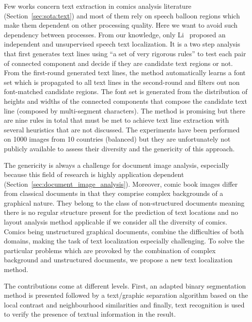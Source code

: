 Few works concern text extraction in comics analysis literature (Section~\ref{sec:sota:text}) and most of them rely on speech balloon regions which make them dependent on other processing quality.
Here we want to avoid such dependency between processes.
From our knowledge, only Li~\cite{Li2013Unsupervised} proposed an independent and unsupervised speech text localization.
It is a two step analysis that first generates text lines using ``a set of very rigorous rules'' to test each pair of connected component and decide if they are candidate text regions or not.
From the first-round generated text lines, the method automatically learns a font set which is propagated to all text lines in the second-round and filters out non font-matched candidate regions.
The font set is generated from the distribution of heights and widths of the connected components that compose the candidate text line (composed by multi-segment characters).
The method is promising but there are nine rules in total that must be met to achieve text line extraction with several heuristics that are not discussed.
The experiments have been performed on 1000 images from 10 countries (balanced) but they are unfortunately not publicly available to assess their diversity and the genericity of this approach. 

The genericity is always a challenge for document image analysis, especially because this field of research is highly application dependent (Section~\ref{sec:document_image_analysis}).
Moreover, comic book images differ from classical documents in that they comprise complex backgrounds of a graphical nature.
They belong to the class of non-structured documents meaning there is no regular structure present for the prediction of text locations and no layout analysis method applicable if we consider all the diversity of comics.
Comics being unstructured graphical documents, combine the difficulties of both domains, making the task of text localization especially challenging.
To solve the particular problems which are provoked by the combination of complex background and unstructured documents, we propose a new text localization method.

The contributions come at different levels. 
First, an adapted binary segmentation method is presented followed by a text/graphic separation algorithm based on the local contrast and neighbourhood similarities and finally, text recognition is used to verify the presence of textual information in the result.

